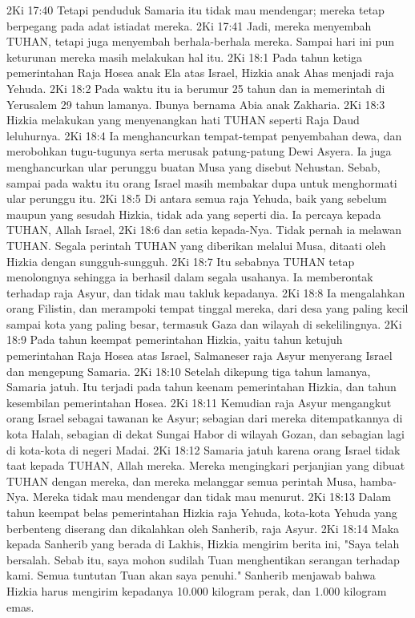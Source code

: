 2Ki 17:40  Tetapi penduduk Samaria itu tidak mau mendengar; mereka tetap berpegang pada adat istiadat mereka.
2Ki 17:41  Jadi, mereka menyembah TUHAN, tetapi juga menyembah berhala-berhala mereka. Sampai hari ini pun keturunan mereka masih melakukan hal itu.
2Ki 18:1  Pada tahun ketiga pemerintahan Raja Hosea anak Ela atas Israel, Hizkia anak Ahas menjadi raja Yehuda.
2Ki 18:2  Pada waktu itu ia berumur 25 tahun dan ia memerintah di Yerusalem 29 tahun lamanya. Ibunya bernama Abia anak Zakharia.
2Ki 18:3  Hizkia melakukan yang menyenangkan hati TUHAN seperti Raja Daud leluhurnya.
2Ki 18:4  Ia menghancurkan tempat-tempat penyembahan dewa, dan merobohkan tugu-tugunya serta merusak patung-patung Dewi Asyera. Ia juga menghancurkan ular perunggu buatan Musa yang disebut Nehustan. Sebab, sampai pada waktu itu orang Israel masih membakar dupa untuk menghormati ular perunggu itu.
2Ki 18:5  Di antara semua raja Yehuda, baik yang sebelum maupun yang sesudah Hizkia, tidak ada yang seperti dia. Ia percaya kepada TUHAN, Allah Israel,
2Ki 18:6  dan setia kepada-Nya. Tidak pernah ia melawan TUHAN. Segala perintah TUHAN yang diberikan melalui Musa, ditaati oleh Hizkia dengan sungguh-sungguh.
2Ki 18:7  Itu sebabnya TUHAN tetap menolongnya sehingga ia berhasil dalam segala usahanya. Ia memberontak terhadap raja Asyur, dan tidak mau takluk kepadanya.
2Ki 18:8  Ia mengalahkan orang Filistin, dan merampoki tempat tinggal mereka, dari desa yang paling kecil sampai kota yang paling besar, termasuk Gaza dan wilayah di sekelilingnya.
2Ki 18:9  Pada tahun keempat pemerintahan Hizkia, yaitu tahun ketujuh pemerintahan Raja Hosea atas Israel, Salmaneser raja Asyur menyerang Israel dan mengepung Samaria.
2Ki 18:10  Setelah dikepung tiga tahun lamanya, Samaria jatuh. Itu terjadi pada tahun keenam pemerintahan Hizkia, dan tahun kesembilan pemerintahan Hosea.
2Ki 18:11  Kemudian raja Asyur mengangkut orang Israel sebagai tawanan ke Asyur; sebagian dari mereka ditempatkannya di kota Halah, sebagian di dekat Sungai Habor di wilayah Gozan, dan sebagian lagi di kota-kota di negeri Madai.
2Ki 18:12  Samaria jatuh karena orang Israel tidak taat kepada TUHAN, Allah mereka. Mereka mengingkari perjanjian yang dibuat TUHAN dengan mereka, dan mereka melanggar semua perintah Musa, hamba-Nya. Mereka tidak mau mendengar dan tidak mau menurut.
2Ki 18:13  Dalam tahun keempat belas pemerintahan Hizkia raja Yehuda, kota-kota Yehuda yang berbenteng diserang dan dikalahkan oleh Sanherib, raja Asyur.
2Ki 18:14  Maka kepada Sanherib yang berada di Lakhis, Hizkia mengirim berita ini, "Saya telah bersalah. Sebab itu, saya mohon sudilah Tuan menghentikan serangan terhadap kami. Semua tuntutan Tuan akan saya penuhi." Sanherib menjawab bahwa Hizkia harus mengirim kepadanya 10.000 kilogram perak, dan 1.000 kilogram emas.

